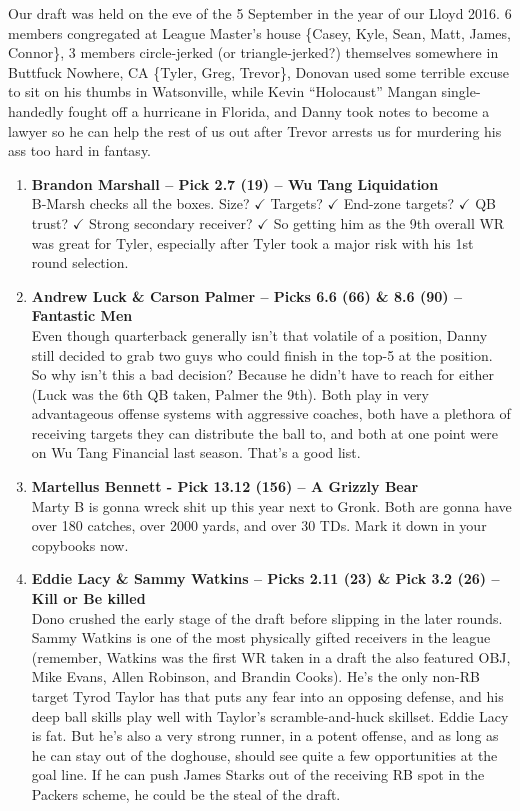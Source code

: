 \documentclass[11pt,letterpaper]{article}
\begin{document}
Our draft was held on the eve of the 5 September in the year of our Lloyd 2016. 6 members congregated at League Master's house \{Casey, Kyle, Sean, Matt, James, Connor\}, 3 members circle-jerked (or triangle-jerked?) themselves somewhere in Buttfuck Nowhere, CA \{Tyler, Greg, Trevor\}, Donovan used some terrible excuse to sit on his thumbs in Watsonville, while Kevin ``Holocaust'' Mangan single-handedly fought off a hurricane in Florida, and Danny took notes to become a lawyer so he can help the rest of us out after Trevor arrests us for murdering his ass too hard in fantasy.

\begin{enumerate}
\item \textbf{Brandon Marshall -- Pick 2.7 (19) -- Wu Tang Liquidation}
\\B-Marsh checks all the boxes. Size? $\checkmark$ Targets? $\checkmark$ End-zone targets? $\checkmark$ QB trust? $\checkmark$ Strong secondary receiver? $\checkmark$ So getting him as the 9th overall WR was great for Tyler, especially after Tyler took a major risk with his 1st round selection.

\item \textbf{Andrew Luck \& Carson Palmer -- Picks 6.6 (66) \& 8.6 (90) -- Fantastic Men}
\\Even though quarterback generally isn't that volatile of a position, Danny still decided to grab two guys who could finish in the top-5 at the position. So why isn't this a bad decision? Because he didn't have to reach for either (Luck was the 6th QB taken, Palmer the 9th). Both play in very advantageous offense systems with aggressive coaches, both have a plethora of receiving targets they can distribute the ball to, and both at one point were on Wu Tang Financial last season. That's a good list.

\item \textbf{Martellus Bennett - Pick 13.12 (156) -- A Grizzly Bear}
\\Marty B is gonna wreck shit up this year next to Gronk. Both are gonna have over 180 catches, over 2000 yards, and over 30 TDs. Mark it down in your copybooks now.

\item \textbf{Eddie Lacy \& Sammy Watkins -- Picks 2.11 (23) \& Pick 3.2 (26) -- Kill or Be killed}
\\Dono crushed the early stage of the draft before slipping in the later rounds. Sammy Watkins is one of the most physically gifted receivers in the league (remember, Watkins was the first WR taken in a draft the also featured OBJ, Mike Evans, Allen Robinson, and Brandin Cooks). He's the only non-RB target Tyrod Taylor has that puts any fear into an opposing defense, and his deep ball skills play well with Taylor's scramble-and-huck skillset. Eddie Lacy is fat. But he's also a very strong runner, in a potent offense, and as long as he can stay out of the doghouse, should see quite a few opportunities at the goal line. If he can push James Starks out of the receiving RB spot in the Packers scheme, he could be the steal of the draft.
 

\end{enumerate}
\end{document}
